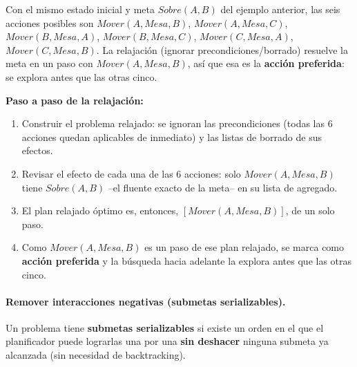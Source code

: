 \begin{example}
Con el mismo estado inicial y meta $Sobre(A,B)$ del ejemplo anterior, las seis acciones posibles son
$Mover(A,Mesa,B)$, $Mover(A,Mesa,C)$, $Mover(B,Mesa,A)$, $Mover(B,Mesa,C)$, $Mover(C,Mesa,A)$,
$Mover(C,Mesa,B)$. La relajación (ignorar precondiciones/borrado) resuelve la meta en un paso con
$Mover(A,Mesa,B)$, así que esa es la \textbf{acción preferida}: se explora antes que las otras cinco.

\textbf{Paso a paso de la relajación:}
\begin{enumerate}
    \item Construir el problema relajado: se ignoran las precondiciones (todas las 6 acciones
    quedan aplicables de inmediato) y las listas de borrado de sus efectos.
    \item Revisar el efecto de cada una de las 6 acciones: solo $Mover(A,Mesa,B)$ tiene
    $Sobre(A,B)$ --el fluente exacto de la meta-- en su lista de agregado.
    \item El plan relajado óptimo es, entonces, $[Mover(A,Mesa,B)]$, de un solo paso.
    \item Como $Mover(A,Mesa,B)$ es un paso de ese plan relajado, se marca como \textbf{acción
    preferida} y la búsqueda hacia adelante la explora antes que las otras cinco.
\end{enumerate}
\end{example}

\paragraph{Remover interacciones negativas (submetas serializables).} Un problema tiene
\textbf{submetas serializables} si existe un orden en el que el planificador puede lograrlas una por
una \textbf{sin deshacer} ninguna submeta ya alcanzada (sin necesidad de backtracking).

